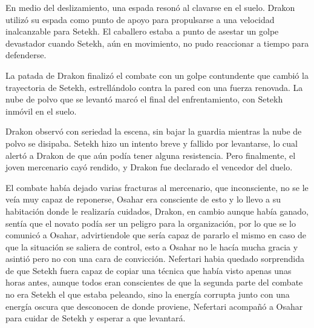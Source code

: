 En medio del deslizamiento, una espada resonó al clavarse en el suelo. Drakon utilizó su espada como punto de apoyo para propulsarse a una velocidad inalcanzable para Setekh. El caballero estaba a punto de asestar un golpe devastador cuando Setekh, aún en movimiento, no pudo reaccionar a tiempo para defenderse.

La patada de Drakon finalizó el combate con un golpe contundente que cambió la trayectoria de Setekh, estrellándolo contra la pared con una fuerza renovada. La nube de polvo que se levantó marcó el final del enfrentamiento, con Setekh inmóvil en el suelo.

Drakon observó con seriedad la escena, sin bajar la guardia mientras la nube de polvo se disipaba. Setekh hizo un intento breve y fallido por levantarse, lo cual alertó a Drakon de que aún podía tener alguna resistencia. Pero finalmente, el joven mercenario cayó rendido, y Drakon fue declarado el vencedor del duelo.

El combate había dejado varias fracturas al mercenario, que inconsciente, no se le veía muy capaz de reponerse, Osahar era consciente de esto y lo llevo a su habitación donde le realizaría cuidados, Drakon, en cambio aunque había ganado, sentía que el novato podía ser un peligro para la organización,
por lo que se lo comunicó a Osahar, advirtiendole que sería capaz de pararlo el mismo en caso de que la situación se saliera de control, esto a Osahar no le hacía mucha gracia y asintió pero no con una cara de convicción. Nefertari habia quedado sorprendida de que Setekh fuera capaz de copiar una técnica que había visto apenas unas horas antes,
aunque todos eran conscientes de que la segunda parte del combate no era Setekh el que estaba peleando, sino la energía corrupta junto con una energía oscura que desconocen de donde proviene, Nefertari acompañó a Osahar para cuidar de Setekh y esperar a que levantará.
